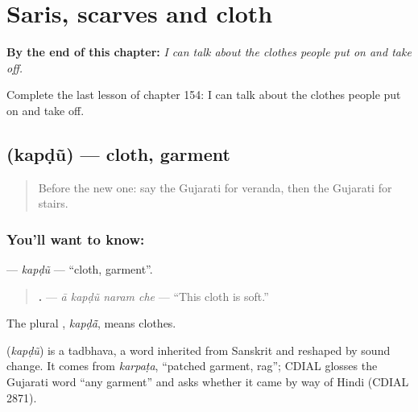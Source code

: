 
\chapter{Saris, scarves and cloth}
\label{ch:gu-saris-scarves-and-cloth}

\begin{chapteropening}
\textbf{By the end of this chapter:} \emph{I can talk about the clothes people put on and take off.}

Complete the last lesson of chapter 154: I can talk about the clothes people put on and take off.
\end{chapteropening}

\section[\texorpdfstring{\gu{કપડું} (kapḍũ)}{કપડું (kapḍũ)}]{ (kapḍũ) — cloth, garment}

\label{lesson:GU-C154-kapdu}



\begin{quote}
Before the new one: say the Gujarati for veranda, then the Gujarati for stairs.
\end{quote}

\subsection*{You'll want to know: }
\textbf{} — \emph{kapḍũ} — \textquotedblleft{}cloth, garment\textquotedblright{}.

\begin{quote}
\textbf{   .} — \emph{ā kapḍũ naram che} — \textquotedblleft{}This cloth is soft.\textquotedblright{}
\end{quote}

The plural \textbf{}, \emph{kapḍā̃}, means clothes.

\begin{cousinweb}
\textbf{} (\emph{kapḍũ}) is a tadbhava, a word inherited from Sanskrit and reshaped by sound change. It comes from \emph{karpaṭa}, \textquotedblleft{}patched garment, rag\textquotedblright{}; CDIAL glosses the Gujarati word \textquotedblleft{}any garment\textquotedblright{} and asks whether it came by way of Hindi (CDIAL 2871).
\end{cousinweb}

